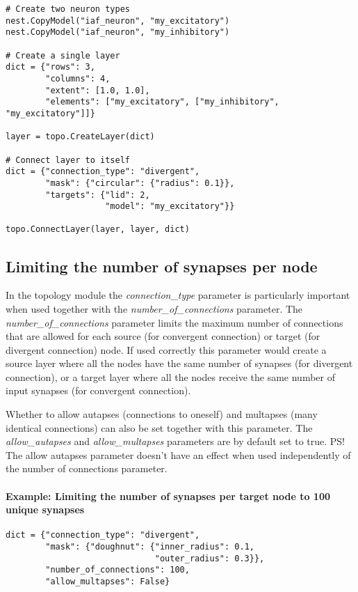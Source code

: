 \documentclass{article}
\begin{document}
\begin{verbatim}
# Create two neuron types
nest.CopyModel("iaf_neuron", "my_excitatory")
nest.CopyModel("iaf_neuron", "my_inhibitory")

# Create a single layer
dict = {"rows": 3,
        "columns": 4,
        "extent": [1.0, 1.0],
        "elements": ["my_excitatory", ["my_inhibitory", "my_excitatory"]]}

layer = topo.CreateLayer(dict)

# Connect layer to itself
dict = {"connection_type": "divergent",
        "mask": {"circular": {"radius": 0.1}},
        "targets": {"lid": 2,
                    "model": "my_excitatory"}}

topo.ConnectLayer(layer, layer, dict)
\end{verbatim}

\subsection{Limiting the number of synapses per node}\label{numberofconnections}

In the topology module the \emph{connection\_type} parameter is particularly important when used together with the \emph{number\_of\_connections} parameter. The \emph{number\_of\_connections} parameter limits the maximum number of connections that are allowed for each source (for convergent connection) or target (for divergent connection) node. If used correctly this parameter would create a source layer where all the nodes have the same number of synapses (for divergent connection), or a target layer where all the nodes receive the same number of input synapses (for convergent connection).

Whether to allow autapses (connections to oneself) and multapses (many identical connections) can also be set together with this parameter. The \emph{allow\_autapses} and \emph{allow\_multapses} parameters are by default set to true. PS! The allow autapses parameter doesn't have an effect when used independently of the number of connections parameter.

\paragraph{Example: Limiting the number of synapses per target node to 100 unique synapses}
\begin{verbatim}
dict = {"connection_type": "divergent",
        "mask": {"doughnut": {"inner_radius": 0.1,
                              "outer_radius": 0.3}},
        "number_of_connections": 100,
        "allow_multapses": False}
\end{verbatim}
\end{document}
